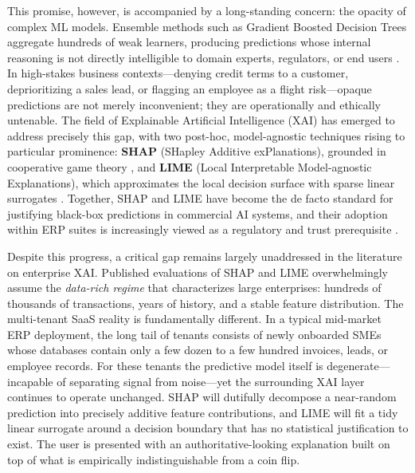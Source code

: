 This promise, however, is accompanied by a long-standing concern: the opacity of complex ML models. Ensemble methods such as Gradient Boosted Decision Trees aggregate hundreds of weak learners, producing predictions whose internal reasoning is not directly intelligible to domain experts, regulators, or end users \citep{rudin2019stop, lipton2018mythos}. In high-stakes business contexts---denying credit terms to a customer, deprioritizing a sales lead, or flagging an employee as a flight risk---opaque predictions are not merely inconvenient; they are operationally and ethically untenable. The field of Explainable Artificial Intelligence (XAI) has emerged to address precisely this gap, with two post-hoc, model-agnostic techniques rising to particular prominence: \textbf{SHAP} (SHapley Additive exPlanations), grounded in cooperative game theory \citep{lundberg2017unified}, and \textbf{LIME} (Local Interpretable Model-agnostic Explanations), which approximates the local decision surface with sparse linear surrogates \citep{ribeiro2016why}. Together, SHAP and LIME have become the de facto standard for justifying black-box predictions in commercial AI systems, and their adoption within ERP suites is increasingly viewed as a regulatory and trust prerequisite \citep{eu2024aiact}.

Despite this progress, a critical gap remains largely unaddressed in the literature on enterprise XAI. Published evaluations of SHAP and LIME overwhelmingly assume the \emph{data-rich regime} that characterizes large enterprises: hundreds of thousands of transactions, years of history, and a stable feature distribution. The multi-tenant SaaS reality is fundamentally different. In a typical mid-market ERP deployment, the long tail of tenants consists of newly onboarded SMEs whose databases contain only a few dozen to a few hundred invoices, leads, or employee records. For these tenants the predictive model itself is degenerate---incapable of separating signal from noise---yet the surrounding XAI layer continues to operate unchanged. SHAP will dutifully decompose a near-random prediction into precisely additive feature contributions, and LIME will fit a tidy linear surrogate around a decision boundary that has no statistical justification to exist. The user is presented with an authoritative-looking explanation built on top of what is empirically indistinguishable from a coin flip.

